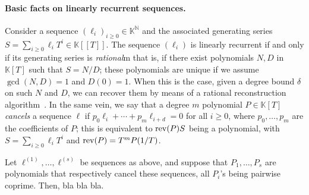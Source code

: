 \documentclass[12pt]{article}
\def\N {\ensuremath{\mathbb{N}}}
\def\K {\ensuremath{\mathbb{K}}}
\begin{document}

\paragraph{Basic facts on linearly recurrent sequences.} Consider a sequence $(\ell_i)_{i \ge 0} \in \K^\N$
and the associated generating series $S=\sum_{i \ge 0} \ell_i T^i \in
\K[[T]]$. The sequence $(\ell_i)$ is {\rm linearly recurrent} if and
only if its generating series is {\em rational}m that is, if there
exist polynomials $N,D$ in $\K[T]$ such that $S=N/D$; these
polynomials are unique if we assume $\gcd(N,D)=1$ and $D(0)=1$. When
this is the case, given a degree bound $\delta$ on such $N$ and $D$,
we can recover them by means of a rational reconstruction
algorithm~\cite{GaGe13}. In the same vein, we say that a degree $m$
polynomial $P\in\K[T]$ {\em cancels} a sequence $\ell$ if $p_0 \ell_i
+ \cdots + p_m \ell_{i+d}=0$ for all $i \ge 0$, where $p_0,\dots,p_m$
are the coefficients of $P$; this is equivalent to ${\rm rev}(P) S$
being a polynomial, with $S=\sum_{i \ge 0} \ell_i T^i$ and ${\rm
  rev}(P)=T^m P(1/T)$.


Let $\ell^{(1)},\dots,\ell^{(s)}$ be sequences as above, and suppose
that $P_1,\dots,P_s$ are polynomials that respectively cancel these
sequences, all $P_i$'s being pairwise coprime. Then, bla bla bla.
\end{document}
